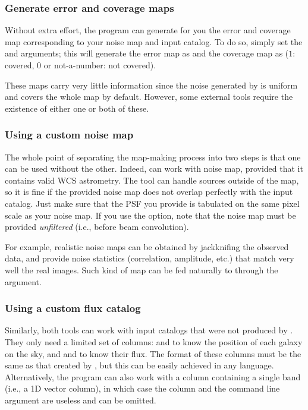 \subsubsection{Generate error and coverage maps}

Without extra effort, the  program can generate for you the error and coverage map corresponding to your noise map and input catalog. To do so, simply set the  and  arguments; this will generate the error map as  and the coverage map as  ($1$: covered, $0$ or not-a-number: not covered).

These maps carry very little information since the noise generated by  is uniform and covers the whole map by default. However, some external tools require the existence of either one or both of these.


\subsubsection{Using a custom noise map}

The whole point of separating the map-making process into two steps is that one can be used without the other. Indeed,  can work with noise map, provided that it contains valid WCS astrometry. The tool can handle sources outside of the map, so it is fine if the provided noise map does not overlap perfectly with the input catalog. Just make sure that the PSF you provide is tabulated on the same pixel scale as your noise map. If you use the  option, note that the noise map must be provided \emph{unfiltered} (i.e., before beam convolution).

For example, realistic \herschel noise maps can be obtained by jackknifing the observed data, and provide noise statistics (correlation, amplitude, etc.) that match very well the real images. Such kind of map can be fed naturally to  through the  argument.


\subsubsection{Using a custom flux catalog}

Similarly, both tools can work with input catalogs that were not produced by . They only need a limited set of columns:  and  to know the position of each galaxy on the sky, and  and  to know their flux. The format of these columns must be the same as that created by , but this can be easily achieved in any language. Alternatively, the program can also work with a  column containing a single band (i.e., a 1D vector column), in which case the  column and the  command line argument are useless and can be omitted.


